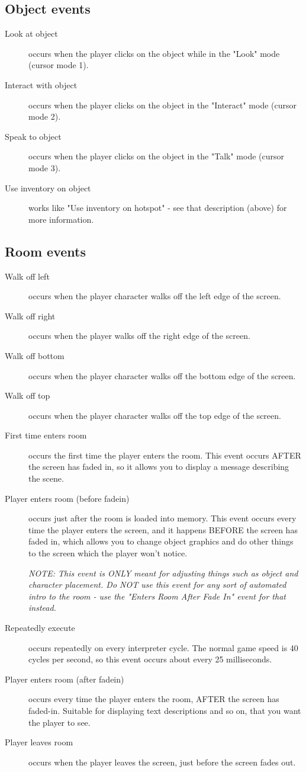 \subsection{Object events}%

\begin{description}
\item [Look at object] occurs when the player clicks on the object while in
the "Look" mode (cursor mode 1).
\item [Interact with object] occurs when the player clicks on the object in
the "Interact" mode (cursor mode 2).
\item [Speak to object] occurs when the player clicks on the object in the
"Talk" mode (cursor mode 3).
\item [Use inventory on object] works like "Use inventory on hotspot" - see
that description (above) for more information.
\end{description}

\subsection{Room events}%

\begin{description}
\item [Walk off left] occurs when the player character walks off the left edge
of the screen.
\item [Walk off right] occurs when the player walks off the right edge of the
screen.
\item [Walk off bottom] occurs when the player character walks off the bottom
edge of the screen.
\item [Walk off top] occurs when the player character walks off the top edge
of the screen.
\item [First time enters room] occurs the first time the player enters the
room. This event occurs AFTER the screen has faded in, so it allows you to
display a message describing the scene.
\item [Player enters room (before fadein)] occurs just after the room is loaded into memory.
This event occurs every time the player enters the screen, and it happens
BEFORE the screen has faded in, which allows you to change object graphics
and do other things to the screen which the player won't notice.

\it{NOTE: This event is ONLY meant for adjusting things such as object and
character placement. Do NOT use this event for any sort of automated intro
to the room - use the "Enters Room After Fade In" event for that instead.}
\item [Repeatedly execute] occurs repeatedly on every interpreter cycle. The
normal game speed is 40 cycles per second, so this event occurs about
every 25 milliseconds.
\item [Player enters room (after fadein)] occurs every time the player enters the
room, AFTER the screen has faded-in. Suitable for displaying text
descriptions and so on, that you want the player to see.
\item [Player leaves room] occurs when the player leaves the screen, just
before the screen fades out.
\end{description}

